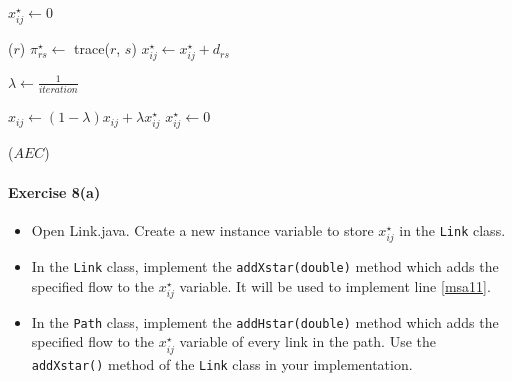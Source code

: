 \documentclass[11pt]{article}
\newcommand{\A}{\mathcal{A}}
\newcommand{\Z}{\mathcal{Z}}
\begin{document}
\begin{algorithmic}[1]
	\For{$(i,j)\in\A$} 
	\State $x^\star_{ij} \leftarrow 0$
	\EndFor
	
	\vspace{0.5\baselineskip}
	
	 \label{msa5}
	\For{$r\in\Z$}  \label{msa6}
	($r$) 
	\For{$s\in\Z$}
	\State $\pi^\star_{rs} \leftarrow$ {\sc trace($r$, $s$)}
	 
	\State $x^\star_{ij} \leftarrow x^\star_{ij} + d_{rs}$ \label{msa11}
	\EndFor
	\EndFor
	\EndFor \label{msa14}
	
	\vspace{0.5\baselineskip}
	
	
	\State $\lambda \leftarrow \frac{1}{iteration}$  \label{msa15}
	
	\vspace{0.5\baselineskip}
	
	\For{$(i,j)\in\A$}  \label{msa16}
	\State $x_{ij} \leftarrow (1-\lambda)x_{ij} + \lambda x^\star_{ij}$ \label{msa17}
	\State $x^\star_{ij}\leftarrow 0$ \label{msa18}
	\EndFor
	
	\vspace{0.5\baselineskip}
	
	($AEC$) 
	
	\EndFor
	\EndProcedure
\end{algorithmic}


\paragraph*{Exercise 8(a)} 
\begin{itemize}
	\item Open Link.java. Create a new instance variable to store $x^\star_{ij}$ in the \texttt{Link} class.
	\item In the \texttt{Link} class, implement the \texttt{addXstar(double)} method which adds the specified flow to the $x^\star_{ij}$ variable.
	It will be used to implement line \ref{msa11}. 
	
	\item In the \texttt{Path} class, implement the \texttt{addHstar(double)} method which adds the specified flow to the $x^\star_{ij}$ variable of every link in the path. Use the \texttt{addXstar()} method of the \texttt{Link} class in your implementation.
\end{itemize}
\end{document}

